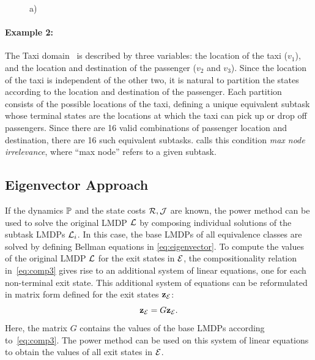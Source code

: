 \begin{figure}[!t]
    \begin{center}
        
    \end{center}
    \caption{a) }
\label{fig:domain_taxi}
\end{figure}
    

\paragraph{Example 2:} The Taxi domain~\citep{Dietterich2000} is described by three variables: the location of the taxi ($v_1$), and the location and destination of the passenger ($v_2$ and $v_3$). Since the location of the taxi is independent of the other two, it is natural to partition the states according to the location and destination of the passenger. Each partition consists of the possible locations of the taxi, defining a unique equivalent subtask whose terminal states are the locations at which the taxi can pick up or drop off passengers. Since there are 16 valid combinations of passenger location and destination, there are 16 such equivalent subtasks.
\citep{Dietterich2000} calls this condition {\em max node irrelevance}, where ``max node'' refers to a given subtask.

\subsection{Eigenvector Approach}
\label{section:hlmdps_eigenvector_episodic}

If the dynamics $\mathbb{P}$ and the state costs $\mathcal{R}, \mathcal{J}$ are known, the power method can be used to solve the original LMDP $\mathcal{L}$ by composing individual solutions of the subtask LMDPs $\mathcal{L}_i$.
In this case, the base LMDPs of all equivalence classes are solved by defining Bellman equations in \eqref{eq:eigenvector}.
To compute the values of the original LMDP $\mathcal{L}$ for the exit states in $\mathcal{E}$, the compositionality relation in~\eqref{eq:comp3} gives rise to an additional system of linear equations, one for each non-terminal exit state. This additional system of equations can be reformulated in matrix form defined for the exit states ${\bf z}_{\mathcal{E}}$:
\begin{equation}\label{eq:exits}
{\bf z}_{\mathcal{E}}=G{\bf z}_{\mathcal{E}}.
\end{equation}
Here, the matrix $G$ contains the values of the base LMDPs according to~\eqref{eq:comp3}.
The power method can be used on this system of linear equations to obtain the values of all exit states in $\mathcal{E}$.

